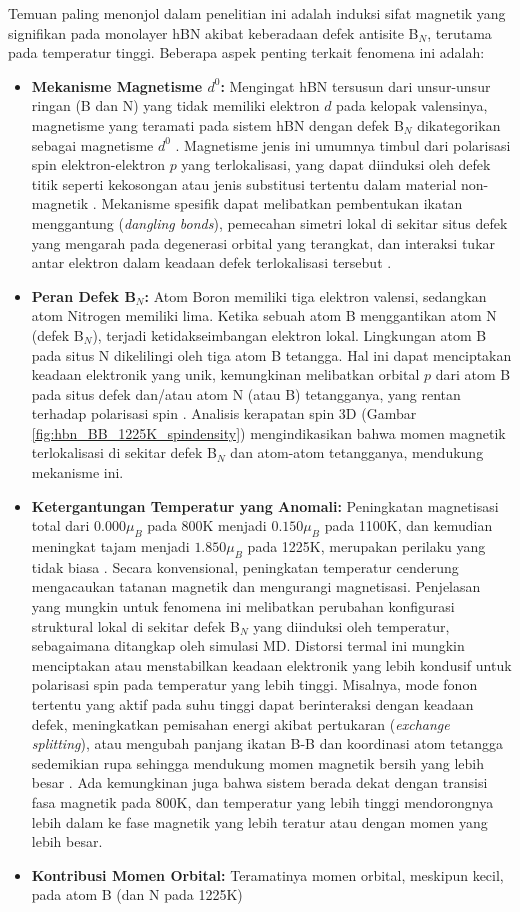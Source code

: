 \label{subsec:asal_magnetisme_bn}
Temuan paling menonjol dalam penelitian ini adalah induksi sifat magnetik yang signifikan pada monolayer hBN akibat keberadaan defek antisite B$_N$, terutama pada temperatur tinggi. Beberapa aspek penting terkait fenomena ini adalah:
\begin{itemize}
    \item \textbf{Mekanisme Magnetisme $d^0$:} Mengingat hBN tersusun dari unsur-unsur ringan (B dan N) yang tidak memiliki elektron $d$ pada kelopak valensinya, magnetisme yang teramati pada sistem hBN dengan defek B$_N$ dikategorikan sebagai magnetisme $d^0$ . Magnetisme jenis ini umumnya timbul dari polarisasi spin elektron-elektron $p$ yang terlokalisasi, yang dapat diinduksi oleh defek titik seperti kekosongan atau jenis substitusi tertentu dalam material non-magnetik \citep{Zunger2003}. Mekanisme spesifik dapat melibatkan pembentukan ikatan menggantung (\textit{dangling bonds}), pemecahan simetri lokal di sekitar situs defek yang mengarah pada degenerasi orbital yang terangkat, dan interaksi tukar antar elektron dalam keadaan defek terlokalisasi tersebut \citep{Zhang2020}. \item \textbf{Peran Defek B$_N$:} Atom Boron memiliki tiga elektron valensi, sedangkan atom Nitrogen memiliki lima. Ketika sebuah atom B menggantikan atom N (defek B$_N$), terjadi ketidakseimbangan elektron lokal. Lingkungan atom B pada situs N dikelilingi oleh tiga atom B tetangga. Hal ini dapat menciptakan keadaan elektronik yang unik, kemungkinan melibatkan orbital $p$ dari atom B pada situs defek dan/atau atom N (atau B) tetangganya, yang rentan terhadap polarisasi spin . Analisis kerapatan spin 3D (Gambar \ref{fig:hbn_BB_1225K_spindensity}) mengindikasikan bahwa momen magnetik terlokalisasi di sekitar defek B$_N$ dan atom-atom tetangganya, mendukung mekanisme ini. \item \textbf{Ketergantungan Temperatur yang Anomali:} Peningkatan magnetisasi total dari $0.000 \mu_B$ pada 800K menjadi $0.150 \mu_B$ pada 1100K, dan kemudian meningkat tajam menjadi $1.850 \mu_B$ pada 1225K, merupakan perilaku yang tidak biasa . Secara konvensional, peningkatan temperatur cenderung mengacaukan tatanan magnetik dan mengurangi magnetisasi. Penjelasan yang mungkin untuk fenomena ini melibatkan perubahan konfigurasi struktural lokal di sekitar defek B$_N$ yang diinduksi oleh temperatur, sebagaimana ditangkap oleh simulasi MD. Distorsi termal ini mungkin menciptakan atau menstabilkan keadaan elektronik yang lebih kondusif untuk polarisasi spin pada temperatur yang lebih tinggi. Misalnya, mode fonon tertentu yang aktif pada suhu tinggi dapat berinteraksi dengan keadaan defek, meningkatkan pemisahan energi akibat pertukaran (\textit{exchange splitting}), atau mengubah panjang ikatan B-B dan koordinasi atom tetangga sedemikian rupa sehingga mendukung momen magnetik bersih yang lebih besar . Ada kemungkinan juga bahwa sistem berada dekat dengan transisi fasa magnetik pada 800K, dan temperatur yang lebih tinggi mendorongnya lebih dalam ke fase magnetik yang lebih teratur atau dengan momen yang lebih besar. \item \textbf{Kontribusi Momen Orbital:} Teramatinya momen orbital, meskipun kecil, pada atom B (dan N pada 1225K) 
\end{itemize}
